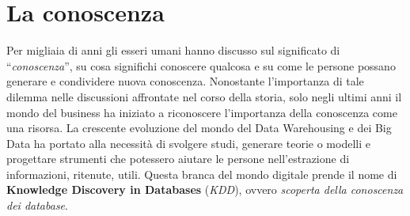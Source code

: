 \section{La conoscenza}

Per migliaia di anni gli esseri umani hanno discusso sul significato di “\textit{conoscenza}”, su cosa significhi conoscere qualcosa e su come le persone possano generare e condividere nuova conoscenza. Nonostante l’importanza di tale dilemma nelle discussioni affrontate nel corso della storia, solo negli ultimi anni il mondo del business ha iniziato a riconoscere l’importanza della conoscenza come una risorsa.\cite{knowledge_management_tools}
La crescente evoluzione del mondo del Data Warehousing e dei Big Data ha portato alla necessità di svolgere studi, generare teorie o modelli e progettare strumenti che potessero aiutare le persone nell’estrazione di informazioni, ritenute, utili. Questa branca del mondo digitale prende il nome di \textbf{Knowledge Discovery in Databases} (\textit{KDD}), ovvero \textit{scoperta della conoscenza dei database}.

